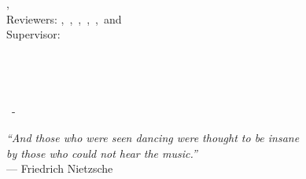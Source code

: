 \hfill
\vfill
{
	\small
	\textbf{\thesisName} \\
	\textit{\thesisTitle} \\
	\thesisSubject, \thesisDate \\
	Reviewers: \thesisFirstReviewer,\ \thesisSecondReviewer,\ \thesisThirdReviewer,\ \thesisFourthReviewer,\ \thesisFifthReviewer,\ and\ \thesisSixthReviewer \\
	Supervisor: \thesisFirstSupervisor \\[1.5em]
	\textbf{\thesisUniversity} \\
	\thesisUniversityInstitute \\
	\thesisUniversityDepartment \\
	\thesisUniversityStreetAddress \\
	\thesisUniversityPostalCode\ - \thesisUniversityCity
}
\clearpage

\hfill
\vfill
\begin{flushright}
	\small
  \textit{``And those who were seen dancing were thought to be insane\\ by those who could not hear the music.''}\\[5mm]
  --- Friedrich Nietzsche
\end{flushright}
\vfill
